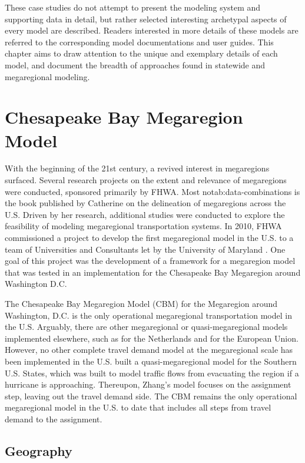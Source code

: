 These case studies do not attempt to present the modeling system and supporting data in detail, but rather selected interesting archetypal aspects of every model are described. Readers interested in more details of these models are referred to the corresponding model documentations and user guides. This chapter aims to draw attention to the unique and exemplary details of each model, and document the breadth of approaches found in statewide and megaregional modeling.

\section{Chesapeake Bay Megaregion Model}\label{sec:chesapeake-bay-megaregion-model}

With the beginning of the 21st century, a revived interest in megaregions surfaced. Several research projects on the extent and relevance of megaregions were conducted, sponsored primarily by FHWA. Most notab:data-combinations is the book published by Catherine \cite{ross09a} on the delineation of megaregions across the U.S. Driven by her research, additional studies were conducted to explore the feasibility of modeling megaregional transportation systems. In 2010, FHWA commissioned a project to develop the first megaregional model in the U.S. to a team of Universities and Consultants let by the University of Maryland \citep{ducca13, moeckel15b}. One goal of this project was the development of a framework for a megaregion model that was tested in an implementation for the Chesapeake Bay Megaregion around Washington D.C.

The Chesapeake Bay Megaregion Model (CBM) for the Megaregion around Washington, D.C. is the only operational megaregional transportation model in the U.S. Arguably, there are other megaregional or quasi-megaregional models implemented elsewhere, such as \cite{gunn94} for the Netherlands and \cite{wegener08} for the European Union. However, no other complete travel demand model at the megaregional scale has been implemented in the U.S. \cite{zhang13} built a quasi-megaregional model for the Southern U.S. States, which was built to model traffic flows from evacuating the region if a hurricane is approaching. Thereupon, Zhang's model focuses on the assignment step, leaving out the travel demand side. The CBM remains the only operational megaregional model in the U.S. to date that includes all steps from travel demand to the assignment.

\subsection{Geography}

